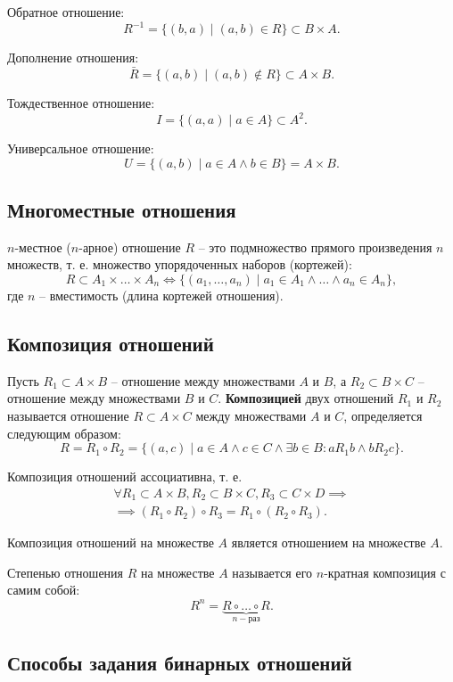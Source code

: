 \documentclass[a5paper, 11pt]{extarticle}
\theoremstyle{definition}
\theoremstyle{definition}
\theoremstyle{definition}
\numberwithin{figure}{section}
\numberwithin{table}{section}
\begin{document}
Обратное отношение:
\[
    R^{-1} = \{(b, a) \mid (a, b) \in R\} \subset B \times A.
\]

Дополнение отношения:
\[
    \bar{R} = \{(a, b) \mid (a, b) \notin R\} \subset A \times B.
\]

Тождественное отношение:
\[
    I = \{(a, a) \mid a \in A\} \subset A^2.
\]

Универсальное отношение:
\[
    U = \{(a, b) \mid a \in A \land b \in B\} = A \times B.
\]

\subsection{Многоместные отношения}

\(n\)-местное (\(n\)-арное) отношение \(R\) -- это подмножество прямого произведения \(n\) множеств, т. е. множество упорядоченных наборов (кортежей):
\[
    R \subset A_1 \times \ldots \times A_n
    \iff
    \{(a_1, \ldots, a_n) \mid a_1 \in A_1 \land \ldots \land a_n \in A_n\},
\]
где \(n\) -- вместимость (длина кортежей отношения).

\subsection{Композиция отношений}

Пусть \(R_1 \subset A \times B\) -- отношение между множествами \(A\) и \(B\), а \(R_2 \subset B \times C\) -- отношение между множествами \(B\) и \(C\). \textbf{Композицией} двух отношений \(R_1\) и \(R_2\) называется отношение \(R \subset A \times C\) между множествами \(A\) и \(C\), определяется следующим образом:
\[
    R = R_1 \circ R_2 =
    \{(a, c) \mid a \in A \land c \in C \land \exists b \in B : a R_1 b \land b R_2 c\}.
\]

Композиция отношений ассоциативна, т. е.
\begin{gather*}
    \forall R_1 \subset A \times B, R_2 \subset B \times C, R_3 \subset C \times D
    \implies \\ \implies
    (R_1 \circ R_2) \circ R_3 = R_1 \circ (R_2 \circ R_3).
\end{gather*}

Композиция отношений на множестве \(A\) является отношением на множестве \(A\).

Степенью отношения \(R\) на множестве \(A\) называется его \(n\)-кратная композиция с самим собой:
\[
    R^n = \underbrace{R \circ \ldots \circ R}_{n-\text{раз}}.
\]


\subsection{Способы задания бинарных отношений}
\end{document}
